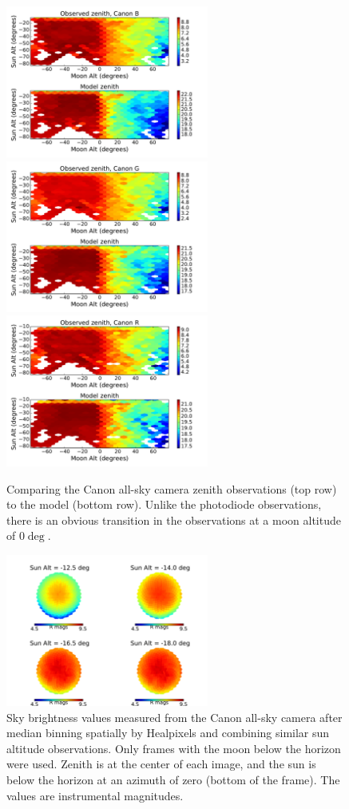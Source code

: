 \documentclass[]{spie}
\begin{document}
\begin{figure}
  \includegraphics[height=5cm]{plots/simple_zenith_comp_B.pdf} \includegraphics[height=5cm]{plots/simple_zenith_comp_G.pdf} \includegraphics[height=5cm]{plots/simple_zenith_comp_R.pdf}
  \caption{Comparing the Canon all-sky camera zenith observations (top row) to the model (bottom row).  Unlike the photodiode observations, there is an obvious transition in the observations at a moon altitude of $0\deg$. \label{fig:compareZenithCanon}}
\end{figure}



\begin{figure}
  \includegraphics[height=5cm]{plots/twiExamples.pdf}
  \caption{Sky brightness values measured from the Canon all-sky camera after median binning spatially by Healpixels and combining similar sun altitude observations. Only frames with the moon below the horizon were used. Zenith is at the center of each image, and the sun is below the horizon at an azimuth of zero (bottom of the frame). The values are instrumental magnitudes.  \label{fig:twiSky}}
\end{figure}
\end{document}
